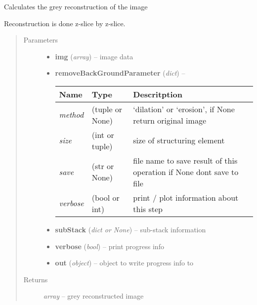\documentclass[letterpaper,10pt,english]{sphinxmanual}
\begin{document}

\begin{fulllineitems}
\label{api/ClearMap.ImageProcessing:ClearMap.ImageProcessing.GreyReconstruction.greyReconstruction}
Calculates the grey reconstruction of the image

Reconstruction is done z-slice by z-slice.
\begin{quote}\begin{description}
\item[{Parameters}] \leavevmode\begin{itemize}
\item {} 
\textbf{img} (\emph{array}) --
image data

\item {} 
\textbf{removeBackGroundParameter} (\emph{dict}) --

\begin{tabulary}{\linewidth}{|L|L|L|}
\hline
\textsf{\relax 
Name
} & \textsf{\relax 
Type
} & \textsf{\relax 
Descritption
}\\
\hline
\emph{method}
 & 
(tuple or None)
 & 
`dilation' or `erosion', if None return original image
\\
\hline
\emph{size}
 & 
(int or tuple)
 & 
size of structuring element
\\
\hline
\emph{save}
 & 
(str or None)
 & 
file name to save result of this operation
if None dont save to file
\\
\hline
\emph{verbose}
 & 
(bool or int)
 & 
print / plot information about this step
\\
\hline\end{tabulary}


\item {} 
\textbf{subStack} (\emph{dict or None}) --
sub-stack information

\item {} 
\textbf{verbose} (\emph{bool}) --
print progress info

\item {} 
\textbf{out} (\emph{object}) --
object to write progress info to

\end{itemize}

\item[{Returns}] \leavevmode
\emph{array} --
grey reconstructed image

\end{description}\end{quote}

\end{fulllineitems}
\end{document}
